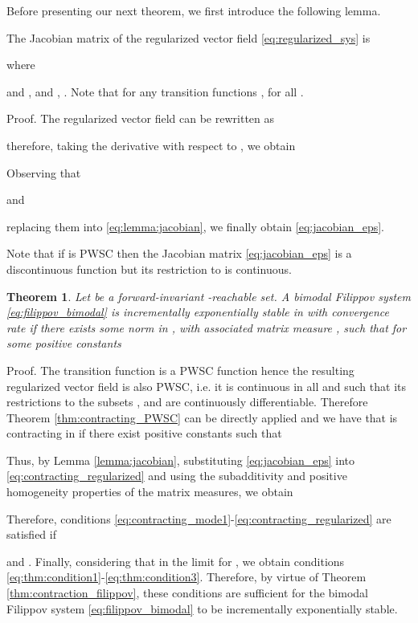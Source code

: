 \documentclass[twocolumn]{autart}
\newtheorem{theorem}{Theorem}
\begin{document}
Before presenting our next theorem, we first introduce the following lemma.
\begin{lem}
\label{lemma:jacobian}
The Jacobian matrix of the regularized vector field \eqref{eq:regularized_sys} is

where

and ,  and , . Note that for any transition functions , for all .
\end{lem}
\begin{pf*}{Proof.}
The regularized vector field  can be rewritten as

therefore, taking the derivative with respect to , we obtain

Observing that

and

replacing them into \eqref{eq:lemma:jacobian}, we finally obtain \eqref{eq:jacobian_eps}.
\end{pf*}
Note that if  is PWSC then the Jacobian matrix \eqref{eq:jacobian_eps} is a discontinuous function but its restriction to  is continuous.
\begin{theorem}
\label{thm:contracting_regularized}
Let  be a forward-invariant -reachable set. A bimodal Filippov system \eqref{eq:filippov_bimodal} is incrementally exponentially stable in  with convergence rate  if there exists some norm in , with associated matrix measure , such that for some positive constants 

\end{theorem}
\begin{pf*}{Proof.}
The transition function  is a PWSC function hence the resulting regularized vector field  is also PWSC, i.e. it is continuous in all  and such that its restrictions to the subsets ,  and  are continuously differentiable. Therefore Theorem \ref{thm:contracting_PWSC} can be directly applied and we have that  is contracting in  if there exist positive constants  such that

Thus, by Lemma \ref{lemma:jacobian}, substituting \eqref{eq:jacobian_eps} into \eqref{eq:contracting_regularized} and using the subadditivity and positive homogeneity properties of the matrix measures, we obtain

Therefore, conditions \eqref{eq:contracting_mode1}-\eqref{eq:contracting_regularized} are satisfied if

and . Finally, considering that  in the limit for , we obtain conditions \eqref{eq:thm:condition1}-\eqref{eq:thm:condition3}. Therefore, by virtue of Theorem \ref{thm:contraction_filippov}, these conditions are sufficient for the bimodal Filippov system \eqref{eq:filippov_bimodal} to be incrementally exponentially stable.
\end{pf*}
\end{document}
